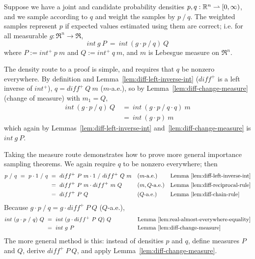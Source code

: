 Suppose we have a joint and candidate probability densities $p,q : \mathbb{R}^n \rightharpoonup [0,\infty)$, and we sample according to $q$ and weight the samples by $p~{/}~q$.
The weighted samples represent $p$ if expected values estimated using them are correct; i.e. for all measurable $g : \Re^n \to \Re$,
\begin{equation}
	int~g~P\ =\ int~(g \cdot p~{/}~q)~Q
\end{equation}
where $P := int^+~p~m$ and $Q := int^+~q~m$, and $m$ is Lebesgue measure on $\Re^n$.

The density route to a proof is simple, and requires that $q$ be nonzero everywhere.
By definition and Lemma~\ref{lem:diff-left-inverse-int} ($diff^+$ is a left inverse of $int^+$), $q = diff^+~Q~m$ ($m$-a.e.), so by Lemma~\ref{lem:diff-change-measure} (change of measure) with $m_1 = Q$,
\begin{equation}
\begin{aligned}
	int~(g \cdot p~{/}~q)~Q
	&\ =\ int~(g \cdot p~{/}~q \cdot q)~m
\\
	&\ =\ int~(g \cdot p)~m
\end{aligned}
\end{equation}
which again by Lemmas~\ref{lem:diff-left-inverse-int} and~\ref{lem:diff-change-measure} is $int~g~P$.

Taking the measure route demonstrates how to prove more general importance sampling theorems.
We again require $q$ to be nonzero everywhere; then
\begin{equation}
\begin{aligned}
	p~{/}~q\ =\ p \cdot 1~{/}~q
	&\ =\ diff^+~P~m \cdot 1~{/}~diff^+~Q~m 
	&&\text{($m$-a.e.)} && \text{Lemma~\ref{lem:diff-left-inverse-int}}
\\
	&\ =\ diff^+~P~m \cdot diff^+~m~Q
	&&\text{($m,Q$-a.e.)} && \text{Lemma~\ref{lem:diff-reciprocal-rule}}
\\
	&\ =\ diff^+~P~Q
	&&\text{($Q$-a.e.)} && \text{Lemma~\ref{lem:diff-chain-rule}}
\end{aligned}
\end{equation}
Because $g \cdot p~{/}~q = g \cdot diff^+~P~Q$ ($Q$-a.e.),
\begin{equation}
\begin{aligned}
	int~(g \cdot p~{/}~q)~Q
	&\ =\ int~(g \cdot diff^+~P~Q)~Q
	&&\hspace{0.5in} \text{Lemma~\ref{lem:real-almost-everywhere-equality}}
\\
	&\ =\ int~g~P
	&&\hspace{0.5in} \text{Lemma~\ref{lem:diff-change-measure}}
\end{aligned}
\end{equation}
The more general method is this: instead of densities $p$ and $q$, define measures $P$ and $Q$, derive $diff^+~P~Q$, and apply Lemma~\ref{lem:diff-change-measure}.

